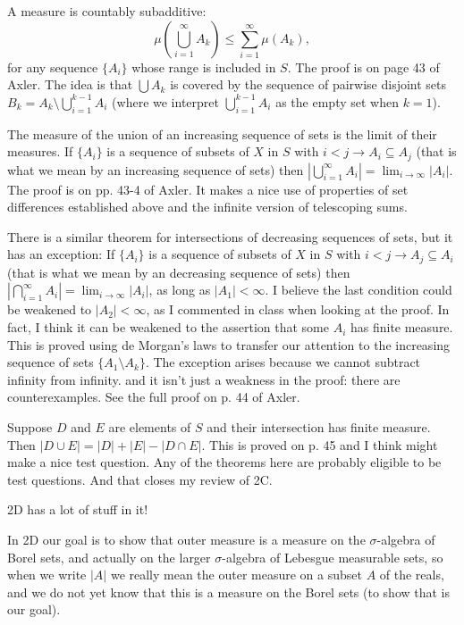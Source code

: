 \documentclass[12pt]{article}
\begin{document}
A measure is countably subadditive: $$\mu(\bigcup_{i=1}^{\infty} A_k) \leq \sum_{i=1}^{\infty}\mu(A_k),$$ for any sequence $\{A_i\}$ whose range is included in $S$.  The proof is on page 43 of Axler.  The idea is that $\bigcup A_k$ is covered by the sequence of pairwise disjoint sets $B_k = A_k \setminus \bigcup_{i=1}^{k-1} A_i$ (where we interpret $\bigcup_{i=1}^{k-1} A_i$ as the empty set when $k=1$).

The measure of the union of an increasing sequence of sets is the limit of their measures.  If $\{A_i\}$ is a sequence of subsets of $X$ in $S$ with $i < j \rightarrow A_i \subseteq A_j$ (that is what we mean by an increasing sequence of sets) then $|\bigcup_{i=1}^\infty A_i| = \lim_{i \rightarrow \infty} |A_i|$.  The proof is on pp. 43-4 of Axler.  It makes a nice use of properties of set differences established above and the infinite version of telescoping sums.

There is a similar theorem for intersections of decreasing sequences of sets, but it has an exception:   If $\{A_i\}$ is a sequence of subsets of $X$ in $S$ with $i < j \rightarrow A_j \subseteq A_i$ (that is what we mean by an decreasing sequence of sets) then $|\bigcap_{i=1}^\infty A_i| = \lim_{i \rightarrow \infty} |A_i|$, as long as $|A_1|<\infty$.  I believe the last condition could be weakened to $|A_2|<\infty$, as I commented in class when looking at the proof.  In fact, I think it can be weakened to the assertion that some $A_i$ has finite measure.  This is proved using de Morgan's laws to transfer our attention to the increasing sequence of sets $\{A_1 \setminus A_k\}$.  The exception arises because we cannot subtract infinity from infinity. and it isn't just a weakness in the proof:  there are counterexamples.  See the full proof
on p. 44 of Axler.

Suppose $D$ and $E$ are elements of $S$ and their intersection has finite measure.  Then $|D \cup E| = |D| + |E| - |D \cap E|$.   This is proved on p. 45 and I think might make a nice test question.  Any of the theorems here are probably eligible to be test questions.  And that closes my review of 2C.

2D has a lot of stuff in it!

In 2D our goal is to show that outer measure is a measure on the $\sigma$-algebra of Borel sets, and actually on the larger $\sigma$-algebra of Lebesgue measurable sets, so when we write $|A|$ we really mean the outer measure on a subset $A$ of the reals, and we do not yet know that this is a measure on the Borel sets
(to show that is our goal).
\end{document}
